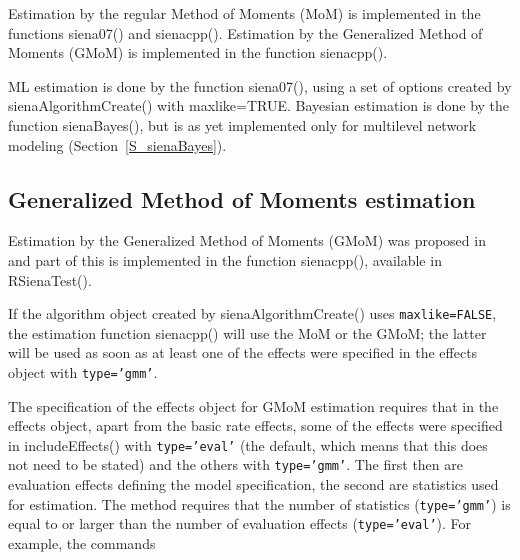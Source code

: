 \documentclass[a4paper,fleqn,11pt]{article}
\newcommand{\+}{\, + \,}
\newcommand{\sfn}[1]{\textsf{#1}}
\begin{document}
Estimation by the regular Method of Moments (MoM)
is implemented in the functions \sfn{siena07()} and \sfn{sienacpp()}.
Estimation by the Generalized Method of Moments (GMoM)
is implemented in the function \sfn{sienacpp()}.

ML estimation is done by the function \sfn{siena07()}, using a set of options
created by \sfn{sienaAlgorithmCreate()} with \sfn{maxlike=TRUE}.
Bayesian estimation is done by the function \sfn{sienaBayes()},
but is as yet implemented only for multilevel network modeling
(Section~\ref{S_sienaBayes}).


\subsection{Generalized Method of Moments estimation}
\label{S_GMoM}

Estimation by the Generalized Method of Moments (GMoM)
was proposed in \citet{ASS2015,ASS2019} and part of this is implemented
in the function \sfn{sienacpp()}, available in \sfn{RSienaTest()}.

If the algorithm object created by \sfn{sienaAlgorithmCreate()}
uses \texttt{maxlike=FALSE}, the estimation function \sfn{sienacpp()}
will use the MoM or the GMoM; the latter will be used as soon as
at least one of the effects were specified in the effects object with
\texttt{type='gmm'}.

The specification of the effects object for GMoM estimation requires
that in the effects object, apart from the basic rate effects,
some of the effects were specified
in  \sfn{includeEffects()} with \texttt{type='eval'}
(the default, which means that this does not need to be stated)
and the others with \texttt{type='gmm'}.
The first then are evaluation effects defining the model specification,
the second are statistics used for estimation.
The method requires that the number of statistics (\texttt{type='gmm'})
is equal to or larger than the number of
evaluation effects (\texttt{type='eval'}).
For example, the commands
\end{document}
